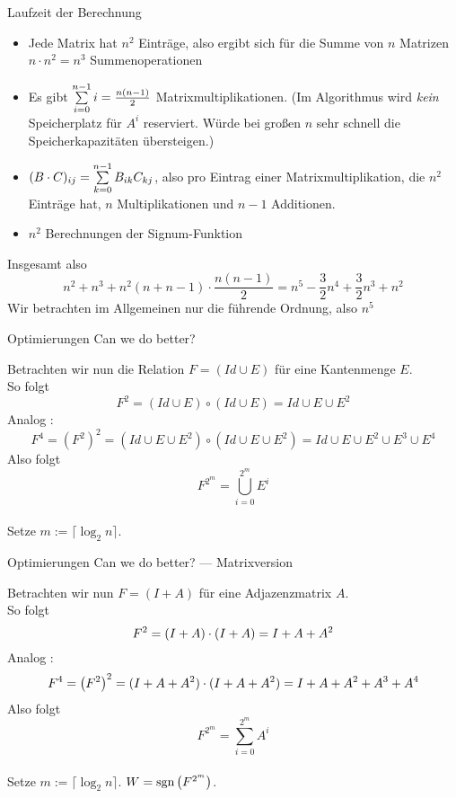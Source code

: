 \begin{frame}{Laufzeit der Berechnung}
	\begin{itemize}[<+->]
		\item Jede Matrix hat $n^2$ Einträge, also ergibt sich für die Summe von $n$ Matrizen $n\cdot n^2=n^3$ Summenoperationen 
		\item  Es gibt $\sum\limits_{i=0}^{n-1} i = \frac{n(n-1)}{2} $ Matrixmultiplikationen. (Im Algorithmus wird \emph{kein} Speicherplatz für $A^i$ reserviert. Würde bei großen $n$ sehr schnell die Speicherkapazitäten übersteigen.) 
		\item $(B\cdot C)_{ij} = \sum\limits_{k=0}^{n-1} B_{ik} C_{kj}$, also pro Eintrag einer Matrixmultiplikation, die $n^2$ Einträge hat, $n$ Multiplikationen und $n-1$ Additionen. 
		\item $n^2$ Berechnungen der Signum-Funktion 
	\end{itemize}
	\pause
	Insgesamt also $$ n^2 + n^3 + n^2(n+n-1)\cdot \frac{n(n-1)}{2} = n^5 - \frac{3}{2} n^4 + \frac{3}{2} n^3 + n^2 $$
	Wir betrachten im Allgemeinen nur die führende Ordnung, also $n^5$
\end{frame}

\begin{frame}{Optimierungen}
	Can we do better? \pause
	\bigskip
	
	Betrachten wir nun die Relation $ F = (Id \cup E) $ für eine Kantenmenge $E$. \\  \pause 
	So folgt $$ F^2 = (Id \cup E) \circ (Id \cup E) = Id \cup E \cup E^2 $$ \pause
	Analog : $$ F^4 = (F^2)^2 = (Id\cup E \cup E^2) \circ (Id\cup E\cup E^2) = Id \cup E \cup E^2 \cup E^3 \cup E^4 $$ \pause 
	Also folgt $$ F^{2^m} = \bigcup\limits_{i=0}^{2^m} E^i$$ \\
	Setze $m := \lceil \log_2 n \rceil $.
\end{frame}

\begin{frame}{Optimierungen}
	Can we do better? --- Matrixversion \pause
	\bigskip
	
	Betrachten wir nun $ F = (I + A) $ für eine Adjazenzmatrix $A$. \\  \pause 
	So folgt $$ F^2 = (I + A) \cdot (I + A) = I + A + A^2 $$ \pause
	Analog : $$ F^4 = \left(F^2\right)^2 = (I + A + A^2) \cdot (I + A + A^2) = I + A + A^2 + A^3 + A^4 $$ \pause 
	Also folgt $$ F^{2^m} = \sum\limits_{i=0}^{2^m} A^i$$ \\
	Setze $m := \lceil \log_2 n \rceil $. \pause \impl $W = \mathop{\text{sgn}}\big(F^{2^m}\big)$.
\end{frame}

